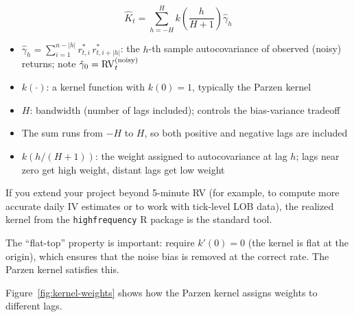 \begin{definition}
\begin{equation}
  \widehat{K}_t = \sum_{h=-H}^{H} k\!\left(\frac{h}{H+1}\right) \hat{\gamma}_h
  \label{eq:realized-kernel}
\end{equation}
\begin{itemize}[nosep]
  \item $\hat{\gamma}_h = \sum_{i=1}^{n-|h|} r^*_{t,i}\, r^*_{t,i+|h|}$: the $h$-th sample autocovariance of observed (noisy) returns; note $\hat{\gamma}_0 = \operatorname{RV}_t^{(\text{noisy})}$
  \item $k(\cdot)$: a kernel function with $k(0) = 1$, typically the Parzen kernel
  \item $H$: bandwidth (number of lags included); controls the bias-variance tradeoff
  \item The sum runs from $-H$ to $H$, so both positive and negative lags are included
  \item $k(h/(H+1))$: the weight assigned to autocovariance at lag $h$; lags near zero get high weight, distant lags get low weight
\end{itemize}
\end{definition}

\begin{projectconnection}
If you extend your project beyond 5-minute RV (for example, to compute more accurate daily IV estimates or to work with tick-level LOB data), the realized kernel from the \texttt{highfrequency} R package is the standard tool.
\end{projectconnection}

The ``flat-top'' property is important: \citet{BNHLS2008} require $k'(0) = 0$ (the kernel is flat at the origin), which ensures that the noise bias is removed at the correct rate.
The Parzen kernel satisfies this.

Figure~\ref{fig:kernel-weights} shows how the Parzen kernel assigns weights to different lags.

